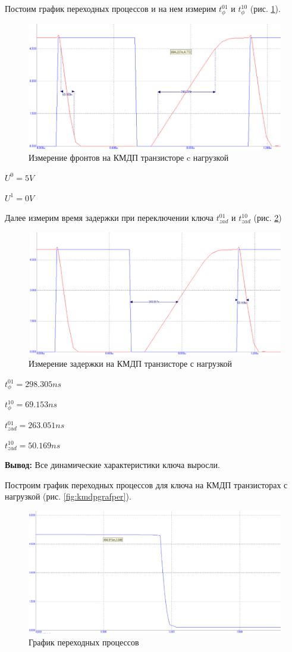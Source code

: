 \documentclass[a4paper,14pt]{article}
\begin{document}
Постоим график переходных процессов и на нем измерим $t^{01}_{\phi}$ и $t^{10}_{\phi}$ (рис.  \ref{fig:kmdpgraffrnagr}).

\begin{figure}[H]
	\centering
	\includegraphics[width=0.7\linewidth]{image/KMDP_graf_fr_nagr}
	\caption{Измерение фронтов на КМДП транзисторе c нагрузкой}
	\label{fig:kmdpgraffrnagr}
\end{figure}

$U^0 = 5V$

$U^1 = 0V$

Далее измерим время задержки при переключении ключа $t^{01}_{zad}$ и $t^{10}_{zad}$ (рис. \ref{fig:kmdpgrafzadnagr})

\begin{figure}[H]
	\centering
	\includegraphics[width=0.7\linewidth]{image/KMDP_graf_zad_nagr}
	\caption{Измерение задержки на КМДП транзисторе с нагрузкой}
	\label{fig:kmdpgrafzadnagr}
\end{figure}

$t^{01}_{\phi} = 298.305ns$

$t^{10}_{\phi} = 69.153ns$

$t^{01}_{zad} = 263.051ns$

$t^{10}_{zad} = 50.169ns$

\textbf{Вывод: } Все динамические характеристики ключа выросли.

Построим график переходных процессов для ключа на КМДП транзисторах с нагрузкой (рис. \ref{fig:kmdpgrafper}).

\begin{figure}[H]
	\centering
	\includegraphics[width=0.7\linewidth]{image/KMDP_graf_per1}
	\caption{График переходных процессов }
	\label{fig:kmdpgrafper1}
\end{figure}
\end{document}
